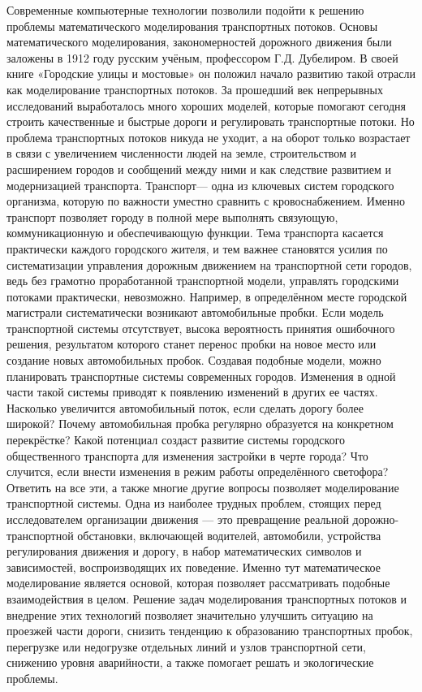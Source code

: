 \documentclass[12pt, a4paper]{extarticle}
\numberwithin{equation}{section}
\begin{document}
Современные компьютерные технологии позволили подойти к решению проблемы математического моделирования транспортных потоков. Основы математического моделирования, закономерностей дорожного движения были заложены в 1912 году русским учёным, профессором Г.Д. Дубелиром. В своей книге «Городские улицы и мостовые» \cite{Street} он положил начало развитию такой отрасли как моделирование транспортных потоков. За прошедший век непрерывных исследований выработалось много хороших моделей, которые помогают сегодня строить качественные и быстрые дороги и регулировать транспортные потоки. Но проблема транспортных потоков никуда не уходит, а на оборот только возрастает в связи с увеличением численности людей на земле, строительством и расширением городов и сообщений между ними и как следствие развитием и модернизацией транспорта.  Транспорт— одна из ключевых систем городского организма, которую по важности уместно сравнить с кровоснабжением. Именно транспорт позволяет городу в полной мере выполнять связующую, коммуникационную и обеспечивающую функции. Тема транспорта касается практически каждого городского жителя, и тем важнее становятся усилия по систематизации управления дорожным движением на транспортной сети городов, ведь без грамотно проработанной транспортной модели, управлять городскими потоками практически, невозможно. Например, в определённом месте городской магистрали систематически возникают автомобильные пробки. Если модель транспортной системы отсутствует, высока вероятность принятия ошибочного решения, результатом которого станет перенос пробки на новое место или создание новых автомобильных пробок. Создавая подобные модели, можно планировать транспортные системы современных городов. Изменения в одной части такой системы приводят к появлению изменений в других ее частях. Насколько увеличится автомобильный поток, если сделать дорогу более широкой? Почему автомобильная пробка регулярно образуется на конкретном перекрёстке? Какой потенциал создаст развитие системы городского общественного транспорта для изменения застройки в черте города? Что случится, если внести изменения в режим работы определённого светофора? Ответить на все эти, а также многие другие вопросы позволяет моделирование транспортной системы. Одна из наиболее трудных проблем, стоящих перед исследователем
организации движения — это превращение реальной дорожно-транспортной обстановки, включающей водителей, автомобили, устройства регулирования движения и дорогу, в набор математических символов и зависимостей, воспроизводящих их поведение. Именно тут математическое моделирование является основой, которая позволяет рассматривать подобные взаимодействия в целом. Решение задач моделирования транспортных потоков и внедрение этих технологий позволяет значительно улучшить ситуацию на проезжей части дороги, снизить тенденцию к образованию транспортных пробок, перегрузке или недогрузке отдельных линий и узлов транспортной сети, снижению уровня аварийности, а также помогает решать и экологические проблемы.
\end{document}
